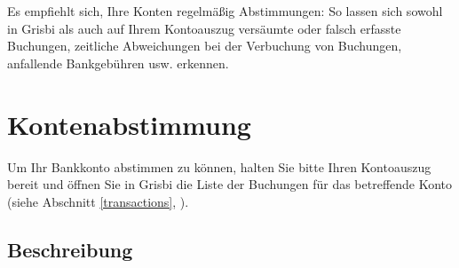 Es empfiehlt sich, Ihre Konten regelmäßig Abstimmungen: So lassen sich sowohl in Grisbi als auch auf Ihrem Kontoauszug versäumte oder falsch erfasste Buchungen, zeitliche Abweichungen bei der Verbuchung von Buchungen, anfallende Bankgebühren usw. erkennen.


\section{Kontenabstimmung\label{reconciliation-account}}

Um Ihr Bankkonto abstimmen zu können, halten Sie bitte Ihren Kontoauszug bereit und öffnen Sie in Grisbi die Liste der Buchungen für das betreffende Konto (siehe Abschnitt \vref{transactions}, ).


\subsection{Beschreibung\label{reconciliation-account-description}}

